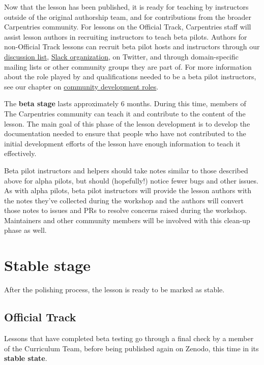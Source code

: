 \documentclass[
]{book}
\begin{document}
Now that the lesson has been published, it is ready
for teaching by instructors outside of the original
authorship team, and for contributions from the broader
Carpentries community. For lessons on the Official Track,
Carpentries staff will assist lesson authors in recruiting instructors
to teach beta pilots. Authors for non-Official Track lessons
can recruit beta pilot hosts and instructors through our
\href{https://carpentries.topicbox.com/groups/discuss}{discussion list}, \href{https://swc-slack-invite.herokuapp.com/}{Slack organization},
on Twitter, and through domain-specific mailing lists
or other community groups they are part of.
For more information about the role played by
and qualifications needed to be a beta pilot instructors, see
our chapter on \href{https://cdh.carpentries.org/community-development-roles.html\#beta-pilot-instructors}{community development roles}.

The \textbf{beta stage} lasts approximately 6 months. During this time, members of
The Carpentries community can teach it and contribute to the content of the lesson.
The main goal of this phase of the lesson development is to develop the documentation
needed to ensure that people who have not contributed to the initial development
efforts of the lesson have enough information to teach it effectively.

Beta pilot instructors and helpers should take notes similar
to those described above for alpha pilots, but should (hopefully!)
notice fewer bugs and other issues. As with alpha pilots,
beta pilot instructors will provide the lesson authors with
the notes they've collected during the workshop and the authors
will convert those notes to issues and PRs to resolve concerns
raised during the workshop. Maintainers and other community members
will be involved with this clean-up phase as well.

\hypertarget{stable-stage}{%
\section{Stable stage}\label{stable-stage}}

After the polishing process, the lesson is ready to be marked as stable.

\hypertarget{official-track-1}{%
\subsection{Official Track}\label{official-track-1}}

Lessons that have completed beta testing go through a final check by a member of the
Curriculum Team, before being published again on Zenodo,
this time in its \textbf{stable state}.
\end{document}
